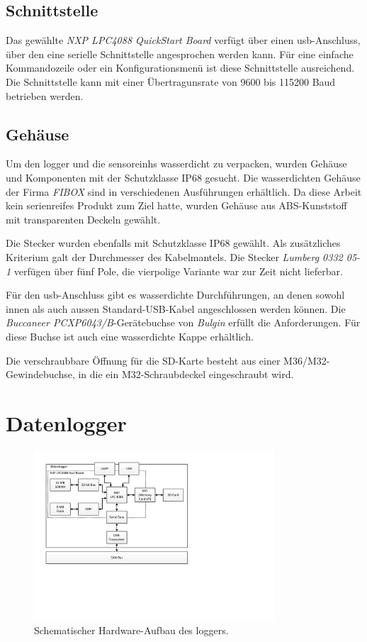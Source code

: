 \subsection{Schnittstelle}
Das gewählte \emph{NXP LPC4088 QuickStart Board} verfügt über einen \gls{usb}-Anschluss, über den eine serielle Schnittstelle angesprochen werden kann. Für eine einfache Kommandozeile oder ein Konfigurationsmenü ist diese Schnittstelle ausreichend. Die Schnittstelle kann mit einer Übertragunsrate von 9600 bis 115200 Baud betrieben werden. 


\subsection{Gehäuse}
Um den \gls{logger} und die \glspl{sensoreinh} wasserdicht zu verpacken, wurden Gehäuse und Komponenten mit der Schutzklasse IP68 gesucht. Die wasserdichten Gehäuse der Firma \emph{FIBOX} sind in verschiedenen Ausführungen erhältlich. Da diese Arbeit kein serienreifes Produkt zum Ziel hatte, wurden Gehäuse aus ABS-Kunststoff mit transparenten Deckeln gewählt. 

Die Stecker wurden ebenfalls mit Schutzklasse IP68 gewählt. Als zusätzliches Kriterium galt der Durchmesser des Kabelmantels. Die Stecker \emph{Lumberg 0332 05-1} verfügen über fünf Pole, die vierpolige Variante war zur Zeit nicht lieferbar.

Für den \gls{usb}-Anschluss gibt es wasserdichte Durchführungen, an denen sowohl innen als auch aussen Standard-USB-Kabel angeschlossen werden können. Die \emph{Buccaneer PCXP6043/B}-Gerätebuchse von \emph{Bulgin} erfüllt die Anforderungen. Für diese Buchse ist auch eine wasserdichte Kappe erhältlich.

Die verschraubbare Öffnung für die SD-Karte besteht aus einer M36/M32-Gewindebuchse, in die ein M32-Schraubdeckel eingeschraubt wird.


\section{Datenlogger}

\begin{figure}
	\centering
		\includegraphics[width=0.8\textwidth]{images/visio/hardware_logger.pdf}
	\caption{Schematischer Hardware-Aufbau des \gls{logger}s.}
	\label{fig.hw_logger}
\end{figure}



